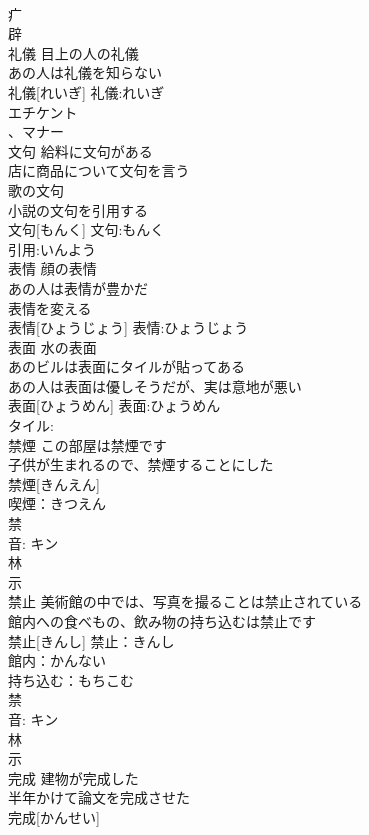 \documentclass[8pt]{extreport}
\begin{document}
\begin{CJK}{UTF8}{min}
\\	疒 
\\	辟 
\\	礼儀	目上の人の礼儀 
\\	あの人は礼儀を知らない 
\\	礼儀[れいぎ]			礼儀:れいぎ
\\	エチケント 
\\	、マナー 
\\	文句	給料に文句がある 
\\	店に商品について文句を言う 
\\	歌の文句 
\\	小説の文句を引用する 
\\	文句[もんく]			文句:もんく
\\	引用:いんよう
\\	表情	顔の表情 
\\	あの人は表情が豊かだ 
\\	表情を変える 
\\	表情[ひょうじょう]			表情:ひょうじょう
\\	表面	水の表面 
\\	あのビルは表面にタイルが貼ってある 
\\	あの人は表面は優しそうだが、実は意地が悪い 
\\	表面[ひょうめん]			表面:ひょうめん
\\	タイル:
\\	禁煙	この部屋は禁煙です 
\\	子供が生まれるので、禁煙することにした 
\\	禁煙[きんえん]			
\\	喫煙：きつえん
\\	禁 
\\	音: キン 
\\	林 
\\	示 
\\	禁止	美術館の中では、写真を撮ることは禁止されている 
\\	館内への食べもの、飲み物の持ち込むは禁止です 
\\	禁止[きんし]			禁止：きんし
\\	館内：かんない
\\	持ち込む：もちこむ
\\	禁 
\\	音: キン 
\\	林 
\\	示 
\\	完成	建物が完成した 
\\	半年かけて論文を完成させた 
\\	完成[かんせい]						

\end{CJK}
\end{document}
